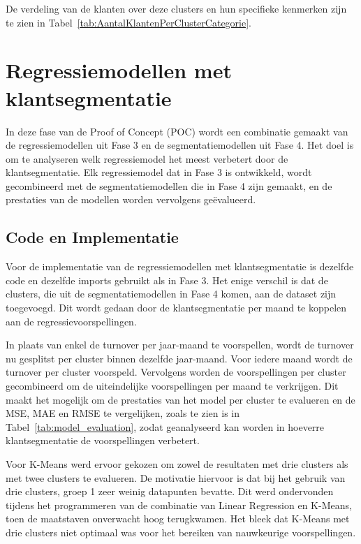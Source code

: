 De verdeling van de klanten over deze clusters en hun specifieke kenmerken zijn te zien in Tabel~\ref{tab:AantalKlantenPerClusterCategorie}.

\newpage

\section{Regressiemodellen met klantsegmentatie}

In deze fase van de Proof of Concept (POC) wordt een combinatie gemaakt van de regressiemodellen uit Fase 3 en de segmentatiemodellen uit Fase 4. Het doel is om te analyseren welk regressiemodel het meest verbetert door de klantsegmentatie. Elk regressiemodel dat in Fase 3 is ontwikkeld, wordt gecombineerd met de segmentatiemodellen die in Fase 4 zijn gemaakt, en de prestaties van de modellen worden vervolgens geëvalueerd.

\subsection{Code en Implementatie}

Voor de implementatie van de regressiemodellen met klantsegmentatie is dezelfde code en dezelfde imports gebruikt als in Fase 3. Het enige verschil is dat de clusters, die uit de segmentatiemodellen in Fase 4 komen, aan de dataset zijn toegevoegd. Dit wordt gedaan door de klantsegmentatie per maand te koppelen aan de regressievoorspellingen.

\vspace{1em}

In plaats van enkel de turnover per jaar-maand te voorspellen, wordt de turnover nu gesplitst per cluster binnen dezelfde jaar-maand. Voor iedere maand wordt de turnover per cluster voorspeld. Vervolgens worden de voorspellingen per cluster gecombineerd om de uiteindelijke voorspellingen per maand te verkrijgen. Dit maakt het mogelijk om de prestaties van het model per cluster te evalueren en de MSE, MAE en RMSE te vergelijken, zoals te zien is in Tabel~\ref{tab:model_evaluation}, zodat geanalyseerd kan worden in hoeverre klantsegmentatie de voorspellingen verbetert.

\vspace{1em}

Voor K-Means werd ervoor gekozen om zowel de resultaten met drie clusters als met twee clusters te evalueren. De motivatie hiervoor is dat bij het gebruik van drie clusters, groep 1 zeer weinig datapunten bevatte. Dit werd ondervonden tijdens het programmeren van de combinatie van Linear Regression en K-Means, toen de maatstaven onverwacht hoog terugkwamen. Het bleek dat K-Means met drie clusters niet optimaal was voor het bereiken van nauwkeurige voorspellingen.

